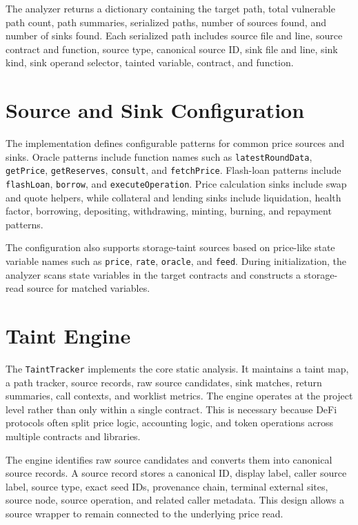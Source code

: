 The analyzer returns a dictionary containing the target path, total vulnerable
path count, path summaries, serialized paths, number of sources found, and
number of sinks found. Each serialized path includes source file and line,
source contract and function, source type, canonical source ID, sink file and
line, sink kind, sink operand selector, tainted variable, contract, and
function.

\section{Source and Sink Configuration}

The implementation defines configurable patterns for common price sources and sinks.
Oracle patterns include function names such as \texttt{latestRoundData},
\texttt{getPrice}, \texttt{getReserves}, \texttt{consult}, and
\texttt{fetchPrice}. Flash-loan patterns include \texttt{flashLoan},
\texttt{borrow}, and \texttt{executeOperation}. Price calculation sinks include
swap and quote helpers, while collateral and lending sinks include liquidation,
health factor, borrowing, depositing, withdrawing, minting, burning, and
repayment patterns.

The configuration also supports storage-taint sources based on price-like state
variable names such as \texttt{price}, \texttt{rate}, \texttt{oracle}, and
\texttt{feed}. During initialization, the analyzer scans state variables in the
target contracts and constructs a storage-read source for matched variables.

\section{Taint Engine}

The \texttt{TaintTracker} implements the core static analysis. It maintains a
taint map, a path tracker, source records, raw source candidates, sink matches,
return summaries, call contexts, and worklist metrics. The engine operates at
the project level rather than only within a single contract. This is necessary
because DeFi protocols often split price logic, accounting logic, and token
operations across multiple contracts and libraries.

The engine identifies raw source candidates and converts them into canonical
source records. A source record stores a canonical ID, display label, caller
source label, source type, exact seed IDs, provenance chain, terminal external
sites, source node, source operation, and related caller metadata. This design
allows a source wrapper to remain connected to the underlying price read.

